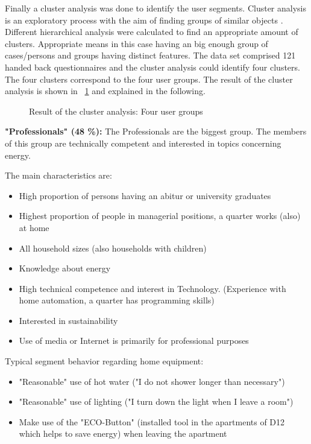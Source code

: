 Finally a cluster analysis was done to identify the user segments. Cluster analysis is an exploratory process with the aim of finding groups of similar objects \cite{tuffery2011data}. Different hierarchical analysis were calculated to find an appropriate amount of clusters. Appropriate means in this case having an big enough group of cases/persons and groups having distinct features. The data set comprised 121 handed back questionnaires and the cluster analysis could identify four clusters. The four clusters correspond to the four user groups. The result of the cluster analysis is shown in ~\ref{fig:cluster} and explained in the following.

\begin{figure}[h]
	\centering
	\caption{Result of the cluster analysis: Four user groups}
	\label{fig:cluster} %
\end{figure}


\textbf{"Professionals" (48 \%):}
The Professionals are the biggest group. The members of this group are technically competent and interested in topics concerning energy.

The main characteristics are:
\begin{itemize}
	\item High proportion of persons having an abitur or university graduates
	\item Highest proportion of people in managerial positions, a quarter works (also) at home
	\item All household sizes (also households with children)
	\item Knowledge about energy
	\item High technical competence and interest in Technology. (Experience with home automation, a quarter has programming skills)
	\item Interested in sustainability
	\item Use of media or Internet is primarily for professional purposes
\end{itemize}

Typical segment behavior regarding home equipment:
 \begin{itemize}
 	\item "Reasonable" use of hot water ("I do not shower longer than necessary")
 	\item "Reasonable" use of lighting ("I turn down the light when I leave a room")
 	\item Make use of the "ECO-Button" (installed tool in the apartments of D12 which helps to save energy) when leaving the apartment
 \end{itemize}

